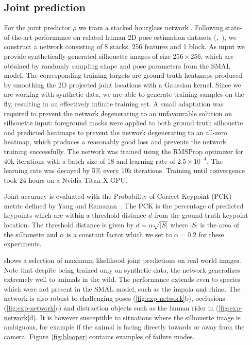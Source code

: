 \subsection{Joint prediction}
\label{sec:exp-network}
For the joint predictor $\rho$ we train a stacked hourglass network \cite{newell2016stacked}. Following state-of-the-art performance on related human 2D pose estimation datasets (\cite{andriluka14cvpr},~\cite{mscoco}), we construct a network consisting of 8 stacks, 256 features and 1 block. As input we provide synthetically-generated silhouette images of size $256\times 256$, which are obtained by randomly sampling shape and pose parameters from the SMAL model. The corresponding training targets are ground truth heatmaps produced by smoothing the 2D projected joint locations with a Gaussian kernel. Since we are working with synthetic data, we are able to generate training samples on the fly, resulting in an effectively infinite training set. A small adaptation was required to prevent the network degenerating to an unfavourable solution on silhouette input: foreground masks were applied to both ground truth silhouette and predicted heatmaps to prevent the network degenerating to an all-zero heatmap, which produces a reasonably good loss and prevents the network training successfully. The network was trained using the RMSProp optimizer for 40k iterations with a batch size of 18 and learning rate of $2.5\times 10^{-4}$. The learning rate was decayed by 5\% every 10k iterations. Training until convergence took 24 hours on a Nvidia Titan X GPU.

Joint accuracy is evaluated with the Probability of Correct Keypoint (PCK) metric defined by Yang and Ramanan~\cite{yang2013articulated}. The PCK is the percentage of predicted keypoints which are within a threshold distance $d$ from the ground truth keypoint location. The threshold distance is given by $d=\alpha\sqrt{|S|}$ where $|S|$ is the area of the silhouette and $\alpha$ is a constant factor which we set to $\alpha=0.2$ for these experiments.

 shows a selection of maximum likelihood joint predictions on real world images. Note that despite being trained only on synthetic data, the network generalizes extremely well to animals in the wild. The performance extends even to species which were not present in the SMAL model, such as the impala and rhino. The network is also robust to challenging poses (\ref{fig:exp-network}b), occlusions (\ref{fig:exp-network}c) and distraction objects such as the human rider in (\ref{fig:exp-network}d). It is however susceptible to situations where the silhouette image is ambiguous, for example if the animal is facing directly towards or away from the camera. Figure~\ref{fig:blooper} contains examples of failure modes.

